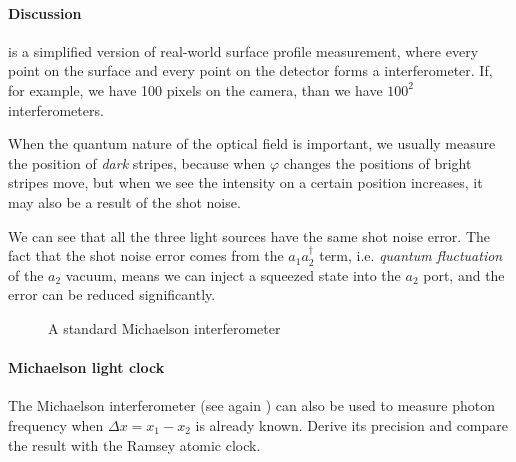 \documentclass[hyperref, a4paper]{article}
\begin{document}
\paragraph{Discussion}  is a simplified version of real-world surface profile measurement, 
where every point on the surface and every point on the detector forms a interferometer.
If, for example, we have 100 pixels on the camera, than we have $100^2$ interferometers.

When the quantum nature of the optical field is important, we usually measure the position of \emph{dark} 
stripes, because when $\varphi$ changes the positions of bright stripes move, but when we see the intensity 
on a certain position increases, it may also be a result of the shot noise. 

We can see that all the three light sources have the same shot noise error. 
The fact that the shot noise error comes from the $a_1 a_2^\dagger$ term, i.e. \emph{quantum fluctuation} 
of the $a_2$ vacuum, means we can inject a squeezed state into the $a_2$ port, and the error can be 
reduced significantly.

\begin{figure}
    \centering
    
    \caption{A standard Michaelson interferometer}
    \label{fig:michaelson}
\end{figure}

\paragraph{}

\paragraph{Michaelson light clock} The Michaelson interferometer (see again ) can also be used
to measure photon frequency when $\Delta x = x_1 - x_2$ is already known. Derive its precision and compare the result with 
the Ramsey atomic clock.
\end{document}
